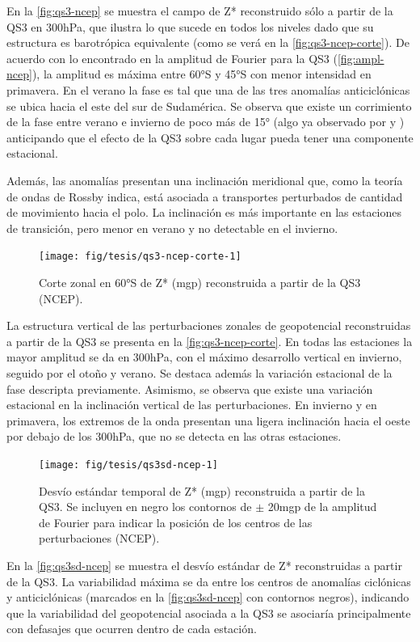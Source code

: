 \documentclass[spanish,a4paper,12pt,oneside]{book}
\begin{document}
En la \autoref{fig:qs3-ncep} se muestra el campo de Z* reconstruido sólo
a partir de la QS3 en 300hPa, que ilustra lo que sucede en todos los
niveles dado que su estructura es barotrópica equivalente (como se verá
en la \autoref{fig:qs3-ncep-corte}). De acuerdo con lo encontrado en la
amplitud de Fourier para la QS3 (\autoref{fig:ampl-ncep}), la amplitud
es máxima entre 60°S y 45°S con menor intensidad en primavera. En el
verano la fase es tal que una de las tres anomalías anticiclónicas se
ubica hacia el este del sur de Sudamérica. Se observa que existe un
corrimiento de la fase entre verano e invierno de poco más de 15° (algo
ya observado por \citet{Loon1972} y \citet{Mo1985}) anticipando que el
efecto de la QS3 sobre cada lugar pueda tener una componente estacional.

Además, las anomalías presentan una inclinación meridional que, como la
teoría de ondas de Rossby indica, está asociada a transportes
perturbados de cantidad de movimiento hacia el polo. La inclinación es
más importante en las estaciones de transición, pero menor en verano y
no detectable en el invierno.

\begin{figure}
\texttt{[image: fig/tesis/qs3-ncep-corte-1]} \caption{Corte zonal en 60°S de Z* (mgp) reconstruida a partir de la QS3 (NCEP).}\label{fig:qs3-ncep-corte}
\end{figure}

La estructura vertical de las perturbaciones zonales de geopotencial
reconstruidas a partir de la QS3 se presenta en la
\autoref{fig:qs3-ncep-corte}. En todas las estaciones la mayor amplitud
se da en 300hPa, con el máximo desarrollo vertical en invierno, seguido
por el otoño y verano. Se destaca además la variación estacional de la
fase descripta previamente. Asimismo, se observa que existe una
variación estacional en la inclinación vertical de las perturbaciones.
En invierno y en primavera, los extremos de la onda presentan una ligera
inclinación hacia el oeste por debajo de los 300hPa, que no se detecta
en las otras estaciones.

\begin{figure}
\texttt{[image: fig/tesis/qs3sd-ncep-1]} \caption{Desvío estándar temporal de Z* (mgp) reconstruida a partir de la QS3. Se incluyen en negro los contornos de $\pm$ 20mgp de la amplitud de Fourier para indicar la posición de los centros de las perturbaciones (NCEP).}\label{fig:qs3sd-ncep}
\end{figure}

En la \autoref{fig:qs3sd-ncep} se muestra el desvío estándar de Z*
reconstruidas a partir de la QS3. La variabilidad máxima se da entre los
centros de anomalías ciclónicas y anticiclónicas (marcados en la
\autoref{fig:qs3sd-ncep} con contornos negros), indicando que la
variabilidad del geopotencial asociada a la QS3 se asociaría
principalmente con defasajes que ocurren dentro de cada estación.
\end{document}
